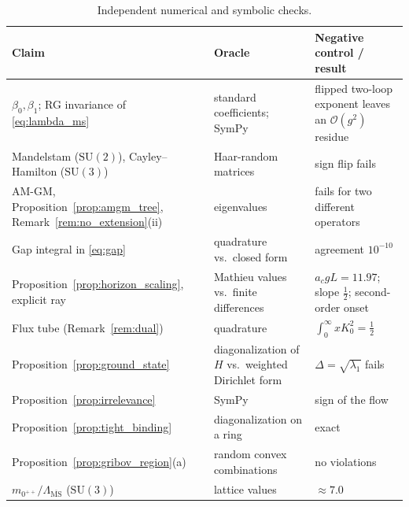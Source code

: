 \documentclass[11pt,a4paper]{amsart}
\theoremstyle{definition}
\newcommand{\MSbar}{\overline{\mathrm{MS}}}
\begin{document}
\begin{table}[htbp]
\centering
\small
\renewcommand{\arraystretch}{1.15}
\caption{Independent numerical and symbolic checks.}
\label{tab:checks}
\begin{tabularx}{\textwidth}{@{} >{\raggedright\arraybackslash}p{4.6cm} >{\raggedright\arraybackslash}X >{\raggedright\arraybackslash}X @{}}
\toprule
\textbf{Claim} & \textbf{Oracle} & \textbf{Negative control / result} \\
\midrule
$\beta_0,\beta_1$; RG invariance of \eqref{eq:lambda_ms} & standard coefficients; SymPy & flipped two-loop exponent leaves an $\mathcal{O}(g^2)$ residue \\
Mandelstam ($\mathrm{SU}(2)$), Cayley--Hamilton ($\mathrm{SU}(3)$) & Haar-random matrices & sign flip fails \\
AM-GM, Proposition~\ref{prop:amgm_tree}, Remark~\ref{rem:no_extension}(ii) & eigenvalues & fails for two different operators \\
Gap integral in \eqref{eq:gap} & quadrature vs.\ closed form & agreement $10^{-10}$ \\
Proposition~\ref{prop:horizon_scaling}, explicit ray & Mathieu values vs.\ finite differences & $a_cgL = 11.97$; slope $\tfrac12$; second-order onset \\
Flux tube (Remark~\ref{rem:dual}) & quadrature & $\int_0^\infty xK_0^2 = \tfrac12$ \\
Proposition~\ref{prop:ground_state} & diagonalization of $H$ vs.\ weighted Dirichlet form & $\Delta = \sqrt{\lambda_1}$ fails \\
Proposition~\ref{prop:irrelevance} & SymPy & sign of the flow \\
Proposition~\ref{prop:tight_binding} & diagonalization on a ring & exact \\
Proposition~\ref{prop:gribov_region}(a) & random convex combinations & no violations \\
$m_{0^{++}}/\Lambda_{\MSbar}$ ($\mathrm{SU}(3)$) & lattice values \cite{morningstar1999glueball, capitani1999nonperturbative} & $\approx 7.0$ \\
\bottomrule
\end{tabularx}
\end{table}
\end{document}
